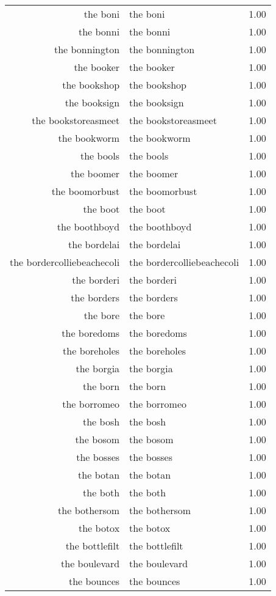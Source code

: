 \begin{table}[ht]
\begin{tabular}{rlr}
  the boni & the boni & 1.00 \\ 
  the bonni & the bonni & 1.00 \\ 
  the bonnington & the bonnington & 1.00 \\ 
  the booker & the booker & 1.00 \\ 
  the bookshop & the bookshop & 1.00 \\ 
  the booksign & the booksign & 1.00 \\ 
  the bookstoreasmeet & the bookstoreasmeet & 1.00 \\ 
  the bookworm & the bookworm & 1.00 \\ 
  the bools & the bools & 1.00 \\ 
  the boomer & the boomer & 1.00 \\ 
  the boomorbust & the boomorbust & 1.00 \\ 
  the boot & the boot & 1.00 \\ 
  the boothboyd & the boothboyd & 1.00 \\ 
  the bordelai & the bordelai & 1.00 \\ 
  the bordercolliebeachecoli & the bordercolliebeachecoli & 1.00 \\ 
  the borderi & the borderi & 1.00 \\ 
  the borders & the borders & 1.00 \\ 
  the bore & the bore & 1.00 \\ 
  the boredoms & the boredoms & 1.00 \\ 
  the boreholes & the boreholes & 1.00 \\ 
  the borgia & the borgia & 1.00 \\ 
  the born & the born & 1.00 \\ 
  the borromeo & the borromeo & 1.00 \\ 
  the bosh & the bosh & 1.00 \\ 
  the bosom & the bosom & 1.00 \\ 
  the bosses & the bosses & 1.00 \\ 
  the botan & the botan & 1.00 \\ 
  the both & the both & 1.00 \\ 
  the bothersom & the bothersom & 1.00 \\ 
  the botox & the botox & 1.00 \\ 
  the bottlefilt & the bottlefilt & 1.00 \\ 
  the boulevard & the boulevard & 1.00 \\ 
  the bounces & the bounces & 1.00 \\ 

\end{tabular}
\end{table}
